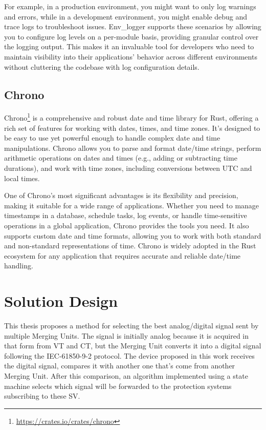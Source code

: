 For example, in a production environment, you might want to only log warnings and errors, while in a development environment, you might enable debug and trace logs to troubleshoot issues. Env\_logger supports these scenarios by allowing you to configure log levels on a per-module basis, providing granular control over the logging output. This makes it an invaluable tool for developers who need to maintain visibility into their applications’ behavior across different environments without cluttering the codebase with log configuration details.

\subsection{Chrono}

Chrono\footnote{\url{https://crates.io/crates/chrono}} is a comprehensive and robust date and time library for Rust, offering a rich set of features for working with dates, times, and time zones. It’s designed to be easy to use yet powerful enough to handle complex date and time manipulations. Chrono allows you to parse and format date/time strings, perform arithmetic operations on dates and times (e.g., adding or subtracting time durations), and work with time zones, including conversions between UTC and local times.

One of Chrono's most significant advantages is its flexibility and precision, making it suitable for a wide range of applications. Whether you need to manage timestamps in a database, schedule tasks, log events, or handle time-sensitive operations in a global application, Chrono provides the tools you need. It also supports custom date and time formats, allowing you to work with both standard and non-standard representations of time. Chrono is widely adopted in the Rust ecosystem for any application that requires accurate and reliable date/time handling.

\section{Solution Design}

This thesis proposes a method for selecting the best analog/digital signal sent by multiple Merging Units. The signal is initially analog because it is acquired in that form from VT and CT, but the Merging Unit converts it into a digital signal following the IEC-61850-9-2 protocol. The device proposed in this work receives the digital signal, compares it with another one that's come from another Merging Unit. After this comparison, an algorithm implemented using a state machine selects which signal will be forwarded to the protection systems subscribing to these SV.

